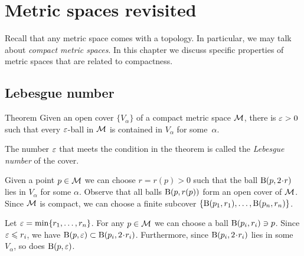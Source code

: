 \chapter{Metric spaces revisited}\label{chap:metric+}

Recall that any metric space comes with a topology.
In particular, we may talk about \textit{compact metric spaces}.
In this chapter we discuss specific properties of metric spaces that are related to compactness.

\section{Lebesgue number}

\begin{thm}{Theorem}\label{prop:lebesgue-number}
Given an open cover $\{V_\alpha\}$ of a compact metric space $\mathcal{M}$,
there is $\varepsilon > 0$ such that every $\varepsilon$-ball in $\mathcal{M}$ is contained in $V_\alpha$ for some~$\alpha$.
\end{thm}

The number $\varepsilon$ that meets the condition in the theorem is called the \emph{Lebesgue number} of the cover.

Given a point $p\in \mathcal{M}$ we can choose $r=r(p)>0$ such that the ball $\Ball(p,2\cdot r)$ lies in $V_\alpha$ for some $\alpha$.
Observe that all balls $\mathrm{B}(p,r(p))$ form an open cover of $\mathcal{M}$.
Since $\mathcal{M}$ is compact, we can choose a finite subcover $\{\mathrm{B}(p_1,r_1),\ldots,\mathrm{B}(p_n,r_n)\}$.

Let $\varepsilon=\min\{r_1,\ldots,r_n\}$.
For any $p\in\mathcal{M}$ we can choose a ball $\mathrm{B}(p_i,r_i)\ni p$.
Since $\varepsilon\leqslant r_i$, we have $\Ball(p,\eps)\subset \Ball(p_i,2\cdot r_i)$.
Furthermore, since $\Ball(p_i,2\cdot r_i)$ lies in some $V_{\alpha}$, so does $\mathrm{B}(p,\varepsilon)$.
\qeds



